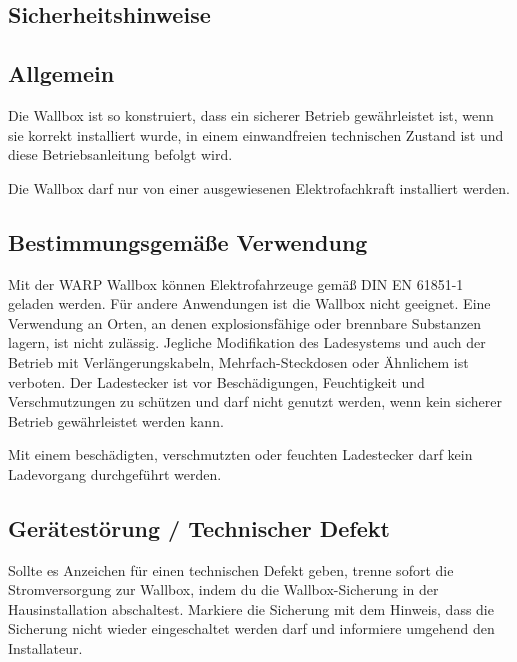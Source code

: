 \documentclass[a4paper,10pt]{article}
\newcommand{\hint}[1]{\begin{tcolorbox}[colback=boxgray,colframe=black,coltext=
white,title=Hinweis]#1\end{tcolorbox}}
\begin{document}
\begin{multicols*}{2}
	\section{Sicherheitshinweise}
	\subsection{Allgemein}
	Die Wallbox ist so konstruiert, dass ein sicherer Betrieb gewährleistet ist,
	wenn sie korrekt installiert wurde, in einem einwandfreien technischen Zustand
	ist und diese Betriebsanleitung befolgt wird. \hint{Die Wallbox darf nur von einer ausgewiesenen Elektrofachkraft installiert
		werden.}

	\subsection{Bestimmungsgemäße Verwendung}
	Mit der WARP Wallbox können Elektrofahrzeuge gemäß DIN EN 61851-1 geladen
	werden. Für andere Anwendungen ist die Wallbox nicht geeignet. Eine Verwendung
	an Orten, an denen explosionsfähige oder brennbare Substanzen lagern, ist nicht
	zulässig. Jegliche Modifikation des Ladesystems und auch der Betrieb mit
	Verlängerungskabeln, Mehrfach-Steckdosen oder Ähnlichem ist verboten. Der
	Ladestecker ist vor Beschädigungen, Feuchtigkeit und Verschmutzungen zu
	schützen und darf nicht genutzt werden, wenn kein sicherer Betrieb
	gewährleistet werden kann. \hint{Mit einem beschädigten, verschmutzten oder feuchten Ladestecker darf kein Ladevorgang durchgeführt
		werden.}

	\subsection{Gerätestörung / Technischer Defekt}
	Sollte es Anzeichen für einen technischen Defekt geben, trenne sofort die
	Stromversorgung zur Wallbox, indem du die Wallbox-Sicherung in der
	Hausinstallation abschaltest. Markiere die Sicherung mit dem Hinweis, dass die
	Sicherung nicht wieder eingeschaltet werden darf und informiere umgehend den
	Installateur.


\end{multicols*}
\end{document}
